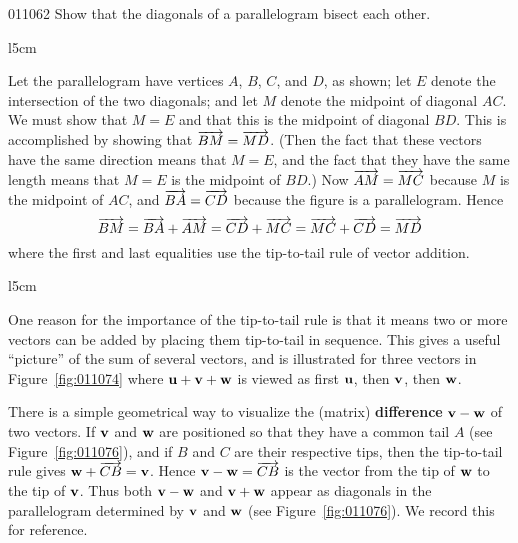 \begin{example}{}{011062}
Show that the diagonals of a parallelogram bisect each other.

\begin{wrapfigure}{l}{5cm} 
  \vspace*{-1em}
\centering

\end{wrapfigure}

\setlength{\rightskip}{0pt plus 200pt} 
\begin{solution}
  Let the parallelogram have vertices $A$, $B$, $C$, and $D$, as shown; let $E$ denote the intersection of the two diagonals; and let $M$ denote the midpoint of diagonal $AC$. We must show that $M = E$ and that this is the midpoint of diagonal $BD$. This is accomplished by showing that $\overrightarrow{BM} = \overrightarrow{MD}$. (Then the fact that these vectors have the same direction means that $M = E$, and the fact that they have the same length means that $M = E$ is the midpoint of $BD$.) Now $\overrightarrow{AM} = \overrightarrow{MC}$ because $M$ is the midpoint of $AC$, and $\overrightarrow{BA} = \overrightarrow{CD}$ because the figure is a parallelogram. Hence
\begin{equation*}
\overrightarrow{BM} = \overrightarrow{BA} + \overrightarrow{AM} = \overrightarrow{CD} + \overrightarrow{MC} = \overrightarrow{MC} + \overrightarrow{CD} = \overrightarrow{MD}
\end{equation*}
where the first and last equalities use the tip-to-tail rule of vector addition.
\end{solution}
\end{example}

\begin{wrapfigure}[9]{l}{5cm} 
\vspace*{-2em}
\centering

\caption{\label{fig:011074}}
\end{wrapfigure}

One
 reason for the importance of the tip-to-tail rule is that it means two 
or more vectors can be added by placing them tip-to-tail in sequence. 
This gives a useful ``picture'' of the sum of several vectors, and is 
illustrated for three vectors in Figure~\ref{fig:011074} where $\textbf{u} + \textbf{v} + \textbf{w}$ is viewed as first $\textbf{u}$, then $\textbf{v}$, then $\textbf{w}$.

There is a simple geometrical way to visualize the (matrix) \textbf{difference} $\textbf{v} - \textbf{w}$ of two vectors. If $\textbf{v}$ and $\textbf{w}$ are positioned so that they have a common tail $A$ (see Figure~\ref{fig:011076}), and if $B$ and $C$ are their respective tips, then the tip-to-tail rule gives $\textbf{w} + \overrightarrow{CB} = \textbf{v}$. Hence $\textbf{v} - \textbf{w} = \overrightarrow{CB}$ is the vector from the tip of $\textbf{w}$ to the tip of $\textbf{v}$. Thus both $\textbf{v} - \textbf{w}$ and $\textbf{v} + \textbf{w}$ appear as diagonals in the parallelogram determined by $\textbf{v}$ and $\textbf{w}$ (see Figure~\ref{fig:011076}). We record this for reference.

